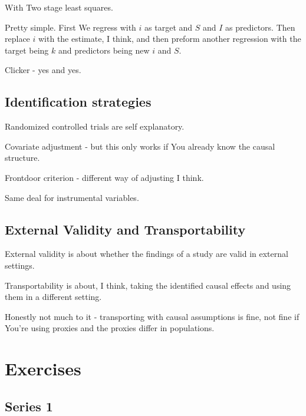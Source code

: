 \documentclass{article}
\begin{document}
		With Two stage least squares.
		
		Pretty simple. First We regress with $i$ as target and $S$ and $I$ as predictors. Then replace $i$ with the estimate, I think, and then preform another regression with the target being $k$ and predictors being new $i$ and $S$.
		 
		Clicker - yes and yes.
		
	\subsection{Identification strategies}
	
		Randomized controlled trials are self explanatory.
		
		Covariate adjustment - but this only works if You already know the causal structure.
		
		Frontdoor criterion - different way of adjusting I think.
		
		Same deal for instrumental variables.
		
	\subsection{External Validity and Transportability}
		
		External validity is about whether the findings of a study are valid in external settings.
		
		Transportability is about, I think, taking the identified causal effects and using them in a different setting.
		
		Honestly not much to it - transporting with causal assumptions is fine, not fine if You're using proxies and the proxies differ in populations.
		
		
		
		
		
		
		
		
		
		
		
		
		
		
		
		
		
		
		
		
		 
		 
\newpage
\section{Exercises}
	
	\subsection{Series 1}
	
\end{document}
